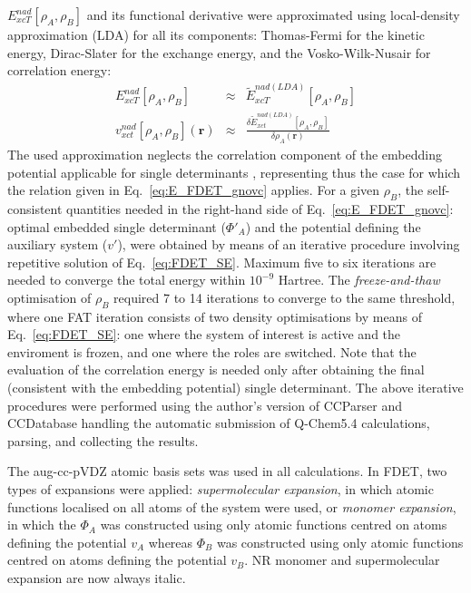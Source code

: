 \documentclass[amsmath,amssymb,preprint,aip,jcp]{revtex4-1}
\newcommand{\nr}[1]{\color{red}#1\color{black}}
\begin{document}
$E_{xcT}^{nad}[\rho_A,\rho_B]$ and its functional derivative \nr{were } approximated using local-density approximation (LDA) for all its components: Thomas-Fermi  \cite{Thomas1927, Fermi1928} for the kinetic energy, Dirac-Slater\cite{Slater1929} for the exchange energy, and the Vosko-Wilk-Nusair \cite{Vosko1980} for correlation energy:
\begin{eqnarray}
{E}_{xcT}^{nad}[\rho_A,\rho_B]&\approx& \tilde {E}_{xcT}^{nad(LDA)}[\rho_A,\rho_B] \\
v_{xct}^{nad}[\rho_A,\rho_B](\mathbf{r})&\approx&\frac{\delta \tilde{E}_{xct}^{nad(LDA)}[\rho_A,\rho_B]}{\delta\rho_A(\mathbf{r})}
\end{eqnarray}
The used approximation neglect\nr{s } the correlation component of the embedding potential applicable for single determinants \cite{Wesolowski2008}, representing thus the case for which the relation given in Eq.~\ref{eq:E_FDET_gnovc} applies. 
For a given $\rho_B$, the self-consistent quantities needed in the right-hand side of Eq.~\ref{eq:E_FDET_gnovc}: 
optimal embedded single determinant ($\Phi'_A$) and the potential defining the auxiliary system ($v'$), 
were obtained by means of an iterative procedure involving repetitive solution of Eq.~\ref{eq:FDET_SE}. 
Maximum five to six iterations are needed to converge the total energy within $10^{-9}$ Hartree. 
The \textit{freeze-and-thaw} optimisation of $\rho_B$ required 7 to 14 iterations to converge to the same threshold, where one FAT iteration \nr{consists of two density optimisations by means of Eq.~\ref{eq:FDET_SE}: one where the system of interest is active and the enviroment is frozen, and one where the roles are switched. }
Note that the evaluation of the correlation energy is needed only after obtaining the final (consistent with the embedding potential) single determinant. 
The above iterative procedures
were performed using the author's version \cite{CCParser_Ricardi} of CCParser\cite{CCParser_Zech} and CCDatabase\cite{CCDatabase} handling the automatic submission of Q-Chem5.4\cite{Qchem54} calculations, parsing, and collecting the results.

The aug-cc-pVDZ \nr{atomic basis sets was } used in all calculations. 
In FDET, two types of expansions were applied: {\it supermolecular expansion}, in which atomic functions localised on all atoms of the system were used, or {\it monomer expansion}, in which the $\Phi_A$ was constructed using only 
atomic functions centred on atoms defining the potential $v_A$ whereas $\Phi_B$ was constructed using only atomic functions centred on atoms defining the potential $v_B$. \nr{NR monomer and supermolecular expansion are now always italic. }
\end{document}
